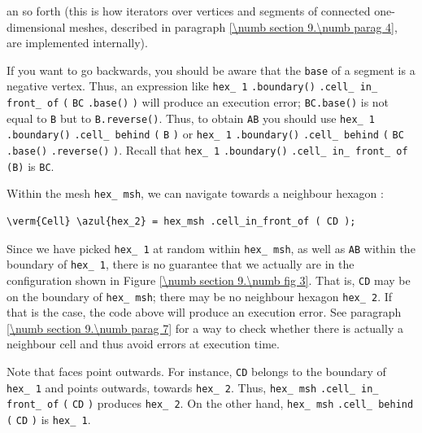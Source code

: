 \noindent an so forth (this is how iterators over vertices and segments of connected
one-dimensional meshes, described in paragraph \ref{\numb section 9.\numb parag 4},
are implemented internally).

If you want to go backwards, you should be aware that the {\small\tt base} of a segment
is a negative vertex.
Thus, an expression like {\small\tt hex\_\,1} {\small\tt .boundary()}
{\small\tt .cell\_\,in\_\,front\_\,of} {\small\tt (} {\small\tt BC} {\small\tt .base()}
{\small\tt )} will produce an execution error;
{\small\tt BC.base()} is not equal to {\small\tt B} but to {\small\tt B.reverse()}.
Thus, to obtain {\small\tt AB} you should use {\small\tt hex\_\,1} {\small\tt .boundary()}
{\small\tt .cell\_\,behind} {\small\tt (} {\small\tt B} {\small\tt )} or {\small\tt hex\_\,1}
{\small\tt .boundary()} {\small\tt .cell\_\,behind}\break
{\small\tt (} {\small\tt BC} {\small\tt .base()} {\small\tt .reverse()} {\small\tt )}.
Recall that {\small\tt hex\_\,1} {\small\tt .boundary()} {\small\tt .cell\_\,in\_\,front\_\,of}
{\small\tt (B)} is {\small\tt BC}.

Within the mesh {\small\tt hex\_\,msh}, we can navigate towards a neighbour hexagon :

\begin{Verbatim}[commandchars=\\\{\},formatcom=\small\tt,
   baselinestretch=0.94,framesep=2mm                      ]
   \verm{Cell} \azul{hex_2} = hex_msh .cell_in_front_of ( CD );
\end{Verbatim}

Since we have picked {\small\tt hex\_\,1} at random within {\small\tt hex\_\,msh},
as well as {\small\tt AB} within the boundary of {\small\tt hex\_\,1},
there is no guarantee that we actually are in the configuration shown in
Figure \ref{\numb section 9.\numb fig 3}.
That is, {\small\tt CD} may be on the boundary of {\small\tt hex\_\,msh};
there may be no neighbour hexagon {\small\tt hex\_\,2}.
If that is the case, the code above will produce an execution error.
See paragraph \ref{\numb section 9.\numb parag 7} for a way to check whether there is actually
a neighbour cell and thus avoid errors at execution time.

Note that faces point outwards.
For instance, {\small\tt CD} belongs to the boundary of {\small\tt hex\_\,1} and points
outwards, towards {\small\tt hex\_\,2}.
Thus, {\small\tt hex\_\,msh} {\small\tt .cell\_\,in\_\,front\_\,of} {\small\tt (} {\small\tt CD} {\small\tt )} produces {\small\tt hex\_\,2}.
On the other hand, {\small\tt hex\_\,msh} {\small\tt .cell\_\,behind} {\small\tt (} {\small\tt CD} {\small\tt )} is {\small\tt hex\_\,1}.


